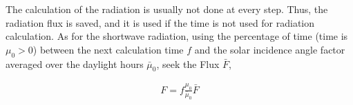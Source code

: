 The calculation of the radiation is usually not done at every step.
Thus, the radiation flux is saved, and it is used if the time is not
used for radiation calculation. As for the shortwave radiation, using
the percentage of time (time is \(\mu_{0}>0\)) between the next
calculation time \(f\) and the solar incidence angle factor averaged
over the daylight hours \(\bar{\mu}_{0}\), seek the Flux \(\bar{F}\),

\begin{eqnarray}
{F}=f \frac{\mu_{0}}{\bar{\mu}_{0}} \bar{F}
\end{eqnarray}
